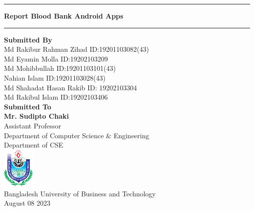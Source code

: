 \begin{titlepage}
\begin{center}
    \hrule
    \vspace{2mm}
    \large \textbf{Report Blood Bank Android Apps}
    \vspace{2mm}
    \hrule
    \vspace{15mm}
    \large \textbf{Submitted By}\\
    \vspace{5.5mm}
  Md Rakibur Rahman Zihad \hspace{11mm} ID:19201103082(43)\\
    Md Eyamin Molla \hspace{14mm} ID:19202103209\\
    Md Mohibbullah \hspace{14mm} ID:19201103101(43)\\
 Nahian Islam \hspace{18mm} ID:19201103028(43)\\
   Md Shahadat Hasan Rakib \hspace{6mm} ID: 19202103304\\
   Md Rakibul Islam \hspace{12} ID:19202103406\\
  \vspace{15mm}
  \huge \textbf{Submitted To}\\
  \large \textbf{Mr. Sudipto Chaki}\\
  Assistant Professor\\
Department of Computer Science & Engineering\\
Department of CSE\\
\vspace{35mm}
\includegraphics[height=2cm]{img/BUBT-Logo.png}\\
\large Bangladesh University of Business and Technology\\
\vspace{10mm}
\large August 08 2023
    
\end{center}
\end{titlepage}